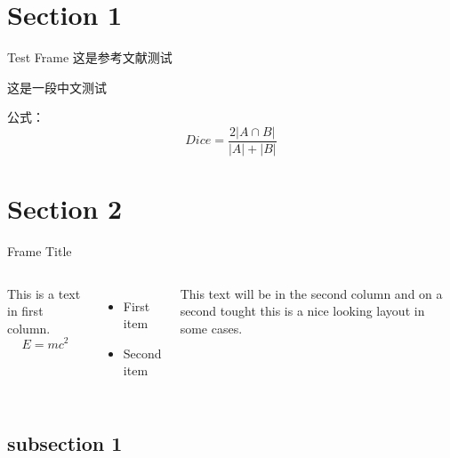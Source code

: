 \section{Section 1}
\begin{frame}[c]{Test Frame} %
    这是参考文献测试\cite{Cheplygina2018NotsosupervisedAS}
    
    这是一段中文测试
    
    公式：
    \[Dice = \frac{2 |A \cap B|}{|A| + |B|}\]
\end{frame}
 
\section{Section 2}
\begin{frame}[c]{Frame Title}
    \begin{columns}
    This is a text in first column.
    $$E=mc^2$$
    \begin{itemize}
    \item First item
    \item Second item
    \end{itemize}
     
    This text will be in the second column
    and on a second tought this is a nice looking
    layout in some cases.
    \end{columns}
\end{frame}

\subsection{subsection 1}